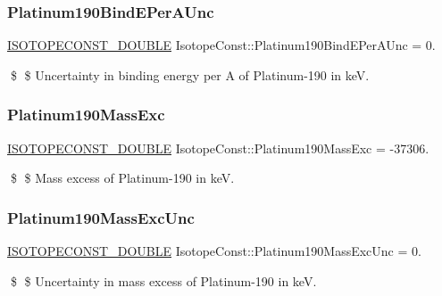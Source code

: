 \subsubsection{\texorpdfstring{Platinum190\+Bind\+E\+Per\+A\+Unc}{Platinum190BindEPerAUnc}}
{\footnotesize\ttfamily \mbox{\hyperlink{group___isotope_const-_macros_ga8f45a7272ce02c0b4c65c44636ed719a}{I\+S\+O\+T\+O\+P\+E\+C\+O\+N\+S\+T\+\_\+\+D\+O\+U\+B\+LE}} Isotope\+Const\+::\+Platinum190\+Bind\+E\+Per\+A\+Unc = 0.}

\$ \$ Uncertainty in binding energy per A of Platinum-\/190 in keV. \mbox{\label{group___isotope_const-_platinum-_pt190_gaace6d52fb9a414445dfc5361455b5c83}} 
\subsubsection{\texorpdfstring{Platinum190\+Mass\+Exc}{Platinum190MassExc}}
{\footnotesize\ttfamily \mbox{\hyperlink{group___isotope_const-_macros_ga8f45a7272ce02c0b4c65c44636ed719a}{I\+S\+O\+T\+O\+P\+E\+C\+O\+N\+S\+T\+\_\+\+D\+O\+U\+B\+LE}} Isotope\+Const\+::\+Platinum190\+Mass\+Exc = -\/37306.}

\$ \$ Mass excess of Platinum-\/190 in keV. \mbox{\label{group___isotope_const-_platinum-_pt190_ga4f0c0b2c50f83de3019e8db741367f70}} 
\subsubsection{\texorpdfstring{Platinum190\+Mass\+Exc\+Unc}{Platinum190MassExcUnc}}
{\footnotesize\ttfamily \mbox{\hyperlink{group___isotope_const-_macros_ga8f45a7272ce02c0b4c65c44636ed719a}{I\+S\+O\+T\+O\+P\+E\+C\+O\+N\+S\+T\+\_\+\+D\+O\+U\+B\+LE}} Isotope\+Const\+::\+Platinum190\+Mass\+Exc\+Unc = 0.}

\$ \$ Uncertainty in mass excess of Platinum-\/190 in keV. \mbox{\label{group___isotope_const-_platinum-_pt190_ga9ef1a71d4be4125f37ee21bfe39864b0}} 
